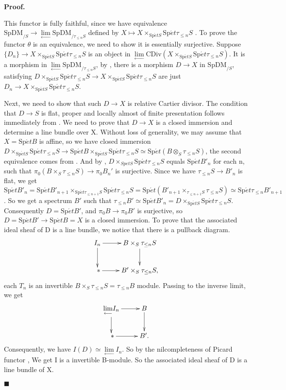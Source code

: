 \documentclass[12pt]{article}
\theoremstyle{thry}
\renewenvironment{proof}
{\par \noindent \textbf{Proof.}}
{ \par \hfill $\blacksquare$ \quad \par }
\def  \CDiv     {\mathrm{CDiv}}
\def  \leftlim  {\underset{\longleftarrow}{\lim}}
\def  \Spet     {\mathrm{Sp}\acute{e}t}
\def  \SpDM     {\mathrm{SpDM}}
\begin{document}
\begin{proof}
\begin{enumerate}
      This functor is fully faithful, since we have equivalence $\SpDM_{/S} \to  \underset{\leftarrow}{\lim}\SpDM_{/\tau_{\leq n} S}$ defined by $X \mapsto X \times_{\Spet S} \Spet \tau_{\leq n}S$ \cite[Proposition 19.4.1.2]{lu-SAG}. To prove the functor $\theta$ is an equivalence, we need to show it is essentially surjective.  Suppose $\{D_n\} \to X \times_{\Spet S} \Spet \tau_{\leq n}S$ is an object in $\leftlim\CDiv(X \times_{\Spet S}  \Spet \tau_{\leq n} S)$. It is a morphism in $ \leftlim \SpDM_{/\tau_{\leq n}S}$, by \cite[Proposition 19.4.1.2]{lu-SAG}, there is a morphism $D \to X$ in $\SpDM_{/S}$, satisfying $D \times_{\Spet S} \Spet \tau_{\leq n}S \to X \times_{\Spet S}\Spet \tau_{\leq n}S $ are just  $D_n \to  X \times_{\Spet S} \Spet \tau_{\leq n} S$. 
      
      
       Next, we need to show  that  such $D \to X$ is relative Cartier divisor. The  condition that $D \to S$ is flat, proper and locally almost of finite presentation follows immediately from \cite[Proposition 19.4.2.1]{lu-SAG}. We need to prove that $D \to X$ is a closed immersion and determine a line bundle over X. Without loss of generality, we may assume that $X= \Spet B$ is affine, so we have closed immersion $D \times_{\Spet S} \Spet \tau_{\leq n} S \to \Spet B \times_{\Spet S} \Spet \tau_{\leq n}S \simeq \Spet ( B \otimes_{S} \tau_{\leq n} S)$, the second equivalence comes from \cite[Proposition 1.4.11.1(3)]{lu-SAG}. And by \cite[Theorem 3.1.2.1]{lu-SAG}, $D \times_{Spet S} \Spet\tau_{\leq n }S$ equals $\Spet B'_n$ for each n, such that $ \pi_0 (B \times_S\tau_{\leq n } S) \to \pi_0 B_n' $ is surjective. Since we have $\tau_{\leq n } S \to B'_n$ is flat, we get $\Spet B'_n = \Spet B'_{n+1} \times_{\Spet \tau_{\leq n+1 } S} \Spet \tau_{\leq n } S  = \Spet (B'_{n+1} \times_{\tau_{\leq n+1 }S} \tau_{\leq n }S) \simeq \Spet \tau_{\leq n } B'_{n+1}$. So we get a  spectrum $B'$ such that $\tau_{\leq n} B' \simeq \Spet B'_n = D \times_{\Spet S}\Spet \tau_{\leq n }S$. Consequently $D = \Spet B'$, and $\pi_0 B  \to \pi_0 B'$ is surjective, so $D = \Spet B' \to \Spet B = X$ is a closed immersion.  To prove that the  associated ideal sheaf of D is a line bundle,  we notice that there is a pullback diagram.
       $$
       \xymatrix{
       I_n  \ar[r]  \ar[d]  &  B \times_S \tau_{\leq n }S  \ar[d]  \\
       \ *   \ar[r]    &      B' \times_S \tau_{\leq n }S,
       }
       $$
       each $T_n$ is an invertible $B \times_S \tau_{\leq n }S = \tau_{\leq n } B$ module. Passing to the inverse limit, we get
       $$
          \xymatrix{
        	 \leftlim I_n  \ar[r]  \ar[d]  &  B   \ar[d]  \\
        	\ *   \ar[r]    &      B'.
        }
       $$
       Consequently, we  have $I(D) \simeq \leftlim I_n$.  So by the nilcompleteness of Picard functor \cite[Corollary 19.2.4.6, Propostion 19.2.4.7]{lu-SAG}, We get I is a  invertible B-module. So the associated ideal sheaf of D is a line bundle of X.
           

\end{enumerate}
\end{proof}
\end{document}

